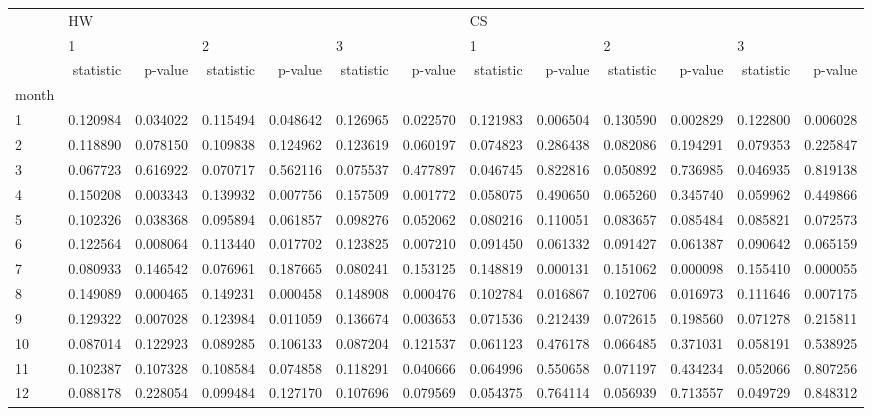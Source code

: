 \begin{tabular}{lrrrrrrrrrrrr}
\toprule
{} & \multicolumn{6}{l}{HW} & \multicolumn{6}{l}{CS} \\
{} & \multicolumn{2}{l}{1} & \multicolumn{2}{l}{2} & \multicolumn{2}{l}{3} & \multicolumn{2}{l}{1} & \multicolumn{2}{l}{2} & \multicolumn{2}{l}{3} \\
{} & statistic &   p-value & statistic &   p-value & statistic &   p-value & statistic &   p-value & statistic &   p-value & statistic &   p-value \\
month &           &           &           &           &           &           &           &           &           &           &           &           \\
\midrule
1     &  0.120984 &  0.034022 &  0.115494 &  0.048642 &  0.126965 &  0.022570 &  0.121983 &  0.006504 &  0.130590 &  0.002829 &  0.122800 &  0.006028 \\
2     &  0.118890 &  0.078150 &  0.109838 &  0.124962 &  0.123619 &  0.060197 &  0.074823 &  0.286438 &  0.082086 &  0.194291 &  0.079353 &  0.225847 \\
3     &  0.067723 &  0.616922 &  0.070717 &  0.562116 &  0.075537 &  0.477897 &  0.046745 &  0.822816 &  0.050892 &  0.736985 &  0.046935 &  0.819138 \\
4     &  0.150208 &  0.003343 &  0.139932 &  0.007756 &  0.157509 &  0.001772 &  0.058075 &  0.490650 &  0.065260 &  0.345740 &  0.059962 &  0.449866 \\
5     &  0.102326 &  0.038368 &  0.095894 &  0.061857 &  0.098276 &  0.052062 &  0.080216 &  0.110051 &  0.083657 &  0.085484 &  0.085821 &  0.072573 \\
6     &  0.122564 &  0.008064 &  0.113440 &  0.017702 &  0.123825 &  0.007210 &  0.091450 &  0.061332 &  0.091427 &  0.061387 &  0.090642 &  0.065159 \\
7     &  0.080933 &  0.146542 &  0.076961 &  0.187665 &  0.080241 &  0.153125 &  0.148819 &  0.000131 &  0.151062 &  0.000098 &  0.155410 &  0.000055 \\
8     &  0.149089 &  0.000465 &  0.149231 &  0.000458 &  0.148908 &  0.000476 &  0.102784 &  0.016867 &  0.102706 &  0.016973 &  0.111646 &  0.007175 \\
9     &  0.129322 &  0.007028 &  0.123984 &  0.011059 &  0.136674 &  0.003653 &  0.071536 &  0.212439 &  0.072615 &  0.198560 &  0.071278 &  0.215811 \\
10    &  0.087014 &  0.122923 &  0.089285 &  0.106133 &  0.087204 &  0.121537 &  0.061123 &  0.476178 &  0.066485 &  0.371031 &  0.058191 &  0.538925 \\
11    &  0.102387 &  0.107328 &  0.108584 &  0.074858 &  0.118291 &  0.040666 &  0.064996 &  0.550658 &  0.071197 &  0.434234 &  0.052066 &  0.807256 \\
12    &  0.088178 &  0.228054 &  0.099484 &  0.127170 &  0.107696 &  0.079569 &  0.054375 &  0.764114 &  0.056939 &  0.713557 &  0.049729 &  0.848312 \\
\bottomrule
\end{tabular}
